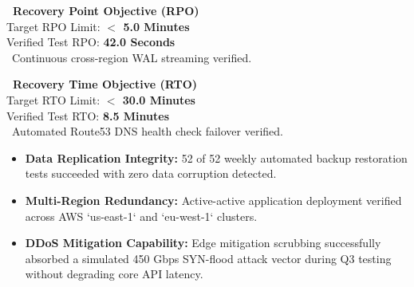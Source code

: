\documentclass[11pt,a4paper]{scrartcl}
\begin{document}
\noindent
\begin{minipage}[t]{0.48\textwidth}
    \begin{tcolorbox}[
        enhanced, colback=lightbg, colframe=cardborder, arc=3pt, boxrule=0.5pt, left=8pt, right=8pt, top=6pt, bottom=6pt
    ]
        \textcolor{navyblue}{\textbf{\faClock\ Recovery Point Objective (RPO)}} \\[3pt]
        \small Target RPO Limit: \textbf{$<$ 5.0 Minutes} \\
        \small Verified Test RPO: \textbf{42.0 Seconds} \\[3pt]
        \textcolor{statusgreen}{\scriptsize\faCheckCircle\ Continuous cross-region WAL streaming verified.}
    \end{tcolorbox}
\end{minipage}%
\hfill
\begin{minipage}[t]{0.48\textwidth}
    \begin{tcolorbox}[
        enhanced, colback=lightbg, colframe=cardborder, arc=3pt, boxrule=0.5pt, left=8pt, right=8pt, top=6pt, bottom=6pt
    ]
        \textcolor{navyblue}{\textbf{\faUndo\ Recovery Time Objective (RTO)}} \\[3pt]
        \small Target RTO Limit: \textbf{$<$ 30.0 Minutes} \\
        \small Verified Test RTO: \textbf{8.5 Minutes} \\[3pt]
        \textcolor{statusgreen}{\scriptsize\faCheckCircle\ Automated Route53 DNS health check failover verified.}
    \end{tcolorbox}
\end{minipage}

\vspace{6pt}

\begin{itemize}[leftmargin=1.2em]
    \item \textbf{Data Replication Integrity:} 52 of 52 weekly automated backup restoration tests succeeded with zero data corruption detected.
    \item \textbf{Multi-Region Redundancy:} Active-active application deployment verified across AWS `us-east-1` and `eu-west-1` clusters.
    \item \textbf{DDoS Mitigation Capability:} Edge mitigation scrubbing successfully absorbed a simulated 450 Gbps SYN-flood attack vector during Q3 testing without degrading core API latency.
\end{itemize}

\clearpage
\end{document}
